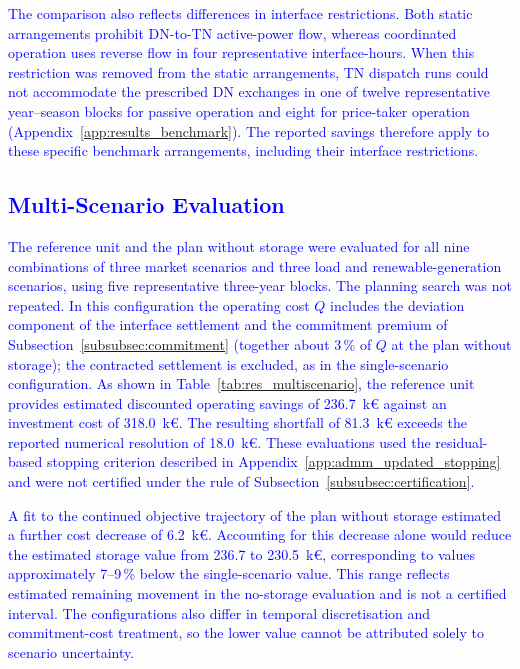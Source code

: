 \documentclass[preprint,12pt]{elsarticle}
\begin{document}
\textcolor{blue}{
    The comparison also reflects differences in interface restrictions. Both static arrangements prohibit DN-to-TN active-power flow, whereas coordinated operation uses reverse flow in four representative interface-hours. When this restriction was removed from the static arrangements, TN dispatch runs could not accommodate the prescribed DN exchanges in one of twelve representative year--season blocks for passive operation and eight for price-taker operation (Appendix~\ref{app:results_benchmark}). The reported savings therefore apply to these specific benchmark arrangements, including their interface restrictions.
}

\subsection{\textcolor{blue}{Multi-Scenario Evaluation}}
\label{subsec:res_multiscenario}

\textcolor{blue}{
    The reference unit and the plan without storage were evaluated for all nine combinations of three market scenarios and three load and renewable-generation scenarios, using five representative three-year blocks. The planning search was not repeated. In this configuration the operating cost $Q$ includes the deviation component of the interface settlement and the commitment premium of Subsection~\ref{subsubsec:commitment} (together about 3\,\% of $Q$ at the plan without storage); the contracted settlement is excluded, as in the single-scenario configuration. As shown in Table~\ref{tab:res_multiscenario}, the reference unit provides estimated discounted operating savings of 236.7~k\euro{} against an investment cost of 318.0~k\euro{}. The resulting shortfall of 81.3~k\euro{} exceeds the reported numerical resolution of 18.0~k\euro{}. These evaluations used the residual-based stopping criterion described in Appendix~\ref{app:admm_updated_stopping} and were not certified under the rule of Subsection~\ref{subsubsec:certification}.
}

\textcolor{blue}{
    A fit to the continued objective trajectory of the plan without storage estimated a further cost decrease of 6.2~k\euro{}. Accounting for this decrease alone would reduce the estimated storage value from 236.7 to 230.5~k\euro{}, corresponding to values approximately 7--9\,\% below the single-scenario value. This range reflects estimated remaining movement in the no-storage evaluation and is not a certified interval. The configurations also differ in temporal discretisation and commitment-cost treatment, so the lower value cannot be attributed solely to scenario uncertainty.
}
\end{document}

